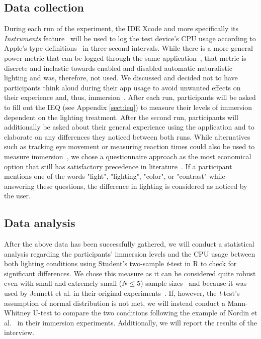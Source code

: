 \documentclass[12pt,twoside,english]{article}
\begin{document}
\subsection{Data collection}
\label{sect:data_collection}

During each run of the experiment, the \gls{IDE} Xcode and more specifically its \textit{Instruments} feature~\cite{apple_xcode_2020} will be used to log the test device's \gls{CPU} usage according to Apple's type definitions~\cite{apple_system_2020} in three second intervals.
While there is a more general power metric that can be logged through the same application~\cite{apple_energy_2020-1}, that metric is discrete and inelastic towards enabled and disabled automatic naturalistic lighting and was, therefore, not used.
We discussed and decided not to have participants think aloud during their app usage to avoid unwanted effects on their experience and, thus, immersion~\cite{van_den_haak_retrospective_2003}.
After each run, participants will be asked to fill out the \gls{IEQ} (see Appendix \ref{sect:ieq}) to measure their levels of immersion dependent on the lighting treatment.
After the second run, participants will additionally be asked about their general experience using the application and to elaborate on any differences they noticed between both runs.
While alternatives such as tracking eye movement or measuring reaction times could also be used to measure immersion~\cite{jennett_measuring_2008}, we chose a questionnaire approach as the most economical option that still has satisfactory precedence in literature~\cite{boyle_engagement_2012}.
If a participant mentions one of the words "light", "lighting", "color", or "contrast" while answering these questions, the difference in lighting is considered as noticed by the user.

\subsection{Data analysis}
\label{sect:data_analysis}

After the above data has been successfully gathered, we will conduct a statistical analysis regarding the participants' immersion levels and the \gls{CPU} usage between both lighting conditions using Student's two-sample \textit{t}-test in R to check for significant differences.
We chose this measure as it can be considered quite robust even with small and extremely small ($ N \leq 5 $) sample sizes~\cite{de_winter_using_2013} and because it was used by Jennett et al. in their original experiments~\cite{jennett_measuring_2008}.
If, however, the \textit{t}-test's assumption of normal distribution is not met, we will instead conduct a Mann-Whitney U-test to compare the two conditions following the example of Nordin et al.~\cite{nordin_attention_2013} in their immersion experiments.
Additionally, we will report the results of the interview.
\end{document}

